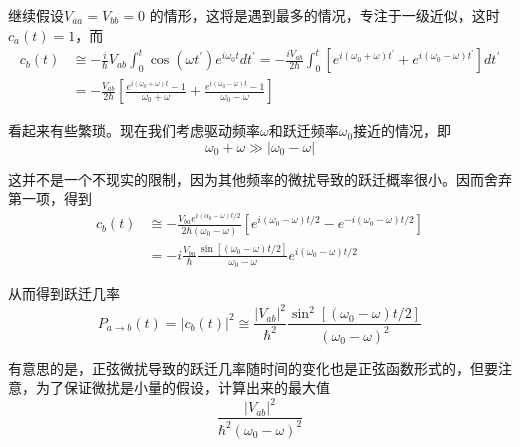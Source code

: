 \documentclass[UTF8]{ctexart}
\begin{document}
    继续假设$V_{aa} = V_{bb} = 0$ 的情形，这将是遇到最多的情况，专注于一级近似，这时$c_a(t)=1$，而
    \begin{equation}
        \begin{aligned}
            c_{b}(t) & \cong-\frac{i}{\hbar} V_{a b} \int_{0}^{t} \cos \left(\omega t^{\prime}\right) e^{i \omega_{0} t} d t^{\prime}=-\frac{i V_{a b}}{2 \hbar} \int_{0}^{t}\left[e^{i\left(\omega_{0}+\omega\right) t^{\prime}}+e^{i\left(\omega_{0}-\omega\right) t^{\prime}}\right] d t^{\prime} \\
            &=-\frac{V_{a b}}{2 \hbar}\left[\frac{e^{i\left(\omega_{0}+\omega\right) t}-1}{\omega_{0}+\omega}+\frac{e^{i\left(\omega_{0}-\omega\right) t}-1}{\omega_{0}-\omega}\right]
            \end{aligned}
    \end{equation}

\noindent 看起来有些繁琐。现在我们考虑驱动频率$\omega$和跃迁频率$ \omega_0 $接近的情况，即
\begin{equation}
    \omega_0 + \omega \gg |\omega_0 - \omega|
\end{equation}

\noindent 这并不是一个不现实的限制，因为其他频率的微扰导致的跃迁概率很小。因而舍弃第一项，得到
\begin{equation}
    \begin{aligned}
        c_{b}(t) & \cong-\frac{V_{b a} e^{i\left(\alpha_{0}-\omega\right) t / 2}}{2 \hbar\left(\omega_{0}-\omega\right)}\left[e^{i\left(\omega_{0}-\omega\right) t / 2}-e^{-i\left(\omega_{0}-\omega\right) t / 2}\right] \\
        &=-i \frac{V_{b a}}{\hbar} \frac{\sin \left[\left(\omega_{0}-\omega\right) t / 2\right]}{\omega_{0}-\omega} e^{i\left(\omega_{0}-\omega\right) t / 2}
        \end{aligned}
\end{equation}

\noindent 从而得到跃迁几率
\begin{equation}
    P_{a \rightarrow b}(t)=\left|c_{b}(t)\right|^{2} \cong \frac{\left|V_{a b}\right|^{2}}{\hbar^{2}} \frac{\sin ^{2}\left[\left(\omega_{0}-\omega\right) t / 2\right]}{\left(\omega_{0}-\omega\right)^{2}}\label{equ7.3}
\end{equation}

\noindent 有意思的是，正弦微扰导致的跃迁几率随时间的变化也是正弦函数形式的，但要注意，为了保证微扰是小量的假设，计算出来的最大值
\begin{equation}
    \frac{|V_{ab}|^2}{\hbar^2 (\omega_0-\omega)^2}
\end{equation}
\end{document}
